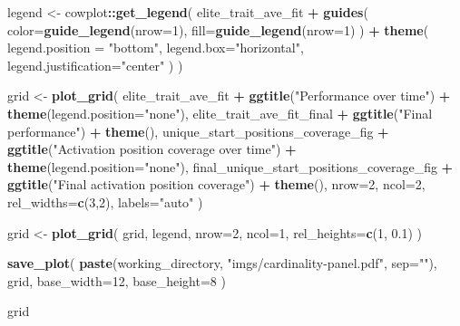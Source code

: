 \documentclass[]{book}
\newenvironment{Shaded}{\begin{snugshade}}{\end{snugshade}}
\newcommand{\DataTypeTok}[1]{\textcolor[rgb]{0.13,0.29,0.53}{#1}}
\newcommand{\DecValTok}[1]{\textcolor[rgb]{0.00,0.00,0.81}{#1}}
\newcommand{\FloatTok}[1]{\textcolor[rgb]{0.00,0.00,0.81}{#1}}
\newcommand{\KeywordTok}[1]{\textcolor[rgb]{0.13,0.29,0.53}{\textbf{#1}}}
\newcommand{\NormalTok}[1]{#1}
\newcommand{\OperatorTok}[1]{\textcolor[rgb]{0.81,0.36,0.00}{\textbf{#1}}}
\newcommand{\StringTok}[1]{\textcolor[rgb]{0.31,0.60,0.02}{#1}}
\begin{document}
\begin{Shaded}
\begin{Highlighting}[]
\NormalTok{legend <-}\StringTok{ }\NormalTok{cowplot}\OperatorTok{::}\KeywordTok{get_legend}\NormalTok{(}
\NormalTok{    elite_trait_ave_fit }\OperatorTok{+}
\StringTok{      }\KeywordTok{guides}\NormalTok{(}
        \DataTypeTok{color=}\KeywordTok{guide_legend}\NormalTok{(}\DataTypeTok{nrow=}\DecValTok{1}\NormalTok{),}
        \DataTypeTok{fill=}\KeywordTok{guide_legend}\NormalTok{(}\DataTypeTok{nrow=}\DecValTok{1}\NormalTok{)}
\NormalTok{      ) }\OperatorTok{+}
\StringTok{      }\KeywordTok{theme}\NormalTok{(}
        \DataTypeTok{legend.position =} \StringTok{"bottom"}\NormalTok{,}
        \DataTypeTok{legend.box=}\StringTok{"horizontal"}\NormalTok{,}
        \DataTypeTok{legend.justification=}\StringTok{"center"}
\NormalTok{      )}
\NormalTok{  )}

\NormalTok{grid <-}\StringTok{ }\KeywordTok{plot_grid}\NormalTok{(}
\NormalTok{  elite_trait_ave_fit }\OperatorTok{+}
\StringTok{    }\KeywordTok{ggtitle}\NormalTok{(}\StringTok{"Performance over time"}\NormalTok{) }\OperatorTok{+}
\StringTok{    }\KeywordTok{theme}\NormalTok{(}\DataTypeTok{legend.position=}\StringTok{"none"}\NormalTok{),}
\NormalTok{  elite_trait_ave_fit_final }\OperatorTok{+}
\StringTok{    }\KeywordTok{ggtitle}\NormalTok{(}\StringTok{"Final performance"}\NormalTok{) }\OperatorTok{+}
\StringTok{    }\KeywordTok{theme}\NormalTok{(),}
\NormalTok{  unique_start_positions_coverage_fig }\OperatorTok{+}
\StringTok{    }\KeywordTok{ggtitle}\NormalTok{(}\StringTok{"Activation position coverage over time"}\NormalTok{) }\OperatorTok{+}
\StringTok{    }\KeywordTok{theme}\NormalTok{(}\DataTypeTok{legend.position=}\StringTok{"none"}\NormalTok{),}
\NormalTok{  final_unique_start_positions_coverage_fig }\OperatorTok{+}
\StringTok{    }\KeywordTok{ggtitle}\NormalTok{(}\StringTok{"Final activation position coverage"}\NormalTok{) }\OperatorTok{+}
\StringTok{    }\KeywordTok{theme}\NormalTok{(),}
  \DataTypeTok{nrow=}\DecValTok{2}\NormalTok{,}
  \DataTypeTok{ncol=}\DecValTok{2}\NormalTok{,}
  \DataTypeTok{rel_widths=}\KeywordTok{c}\NormalTok{(}\DecValTok{3}\NormalTok{,}\DecValTok{2}\NormalTok{),}
  \DataTypeTok{labels=}\StringTok{"auto"}
\NormalTok{)}

\NormalTok{grid <-}\StringTok{ }\KeywordTok{plot_grid}\NormalTok{(}
\NormalTok{  grid,}
\NormalTok{  legend,}
  \DataTypeTok{nrow=}\DecValTok{2}\NormalTok{,}
  \DataTypeTok{ncol=}\DecValTok{1}\NormalTok{,}
  \DataTypeTok{rel_heights=}\KeywordTok{c}\NormalTok{(}\DecValTok{1}\NormalTok{, }\FloatTok{0.1}\NormalTok{)}
\NormalTok{)}

\KeywordTok{save_plot}\NormalTok{(}
  \KeywordTok{paste}\NormalTok{(working_directory, }\StringTok{"imgs/cardinality-panel.pdf"}\NormalTok{, }\DataTypeTok{sep=}\StringTok{""}\NormalTok{),}
\NormalTok{  grid,}
  \DataTypeTok{base_width=}\DecValTok{12}\NormalTok{,}
  \DataTypeTok{base_height=}\DecValTok{8}
\NormalTok{)}

\NormalTok{grid}
\end{Highlighting}
\end{Shaded}
\end{document}
